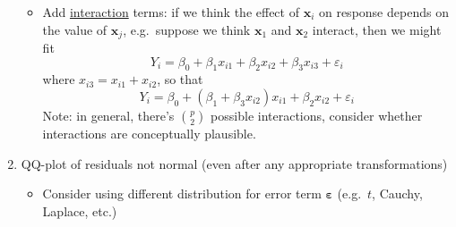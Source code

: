 \begin{enumerate}[label=(\arabic*)]
\begin{itemize}
              \item Add \underline{interaction} terms: if we think the effect
                    of $ \symbf{x}_i $ on response depends on the value of
                    $ \symbf{x}_j $, e.g.\ suppose we think $ \symbf{x}_1 $
                    and $ \symbf{x}_2 $ interact, then we might fit
                    \[ Y_i=\beta_0+\beta_1x_{i1}+\beta_2x_{i2}+\beta_3x_{i3}+\varepsilon_i \]
                    where $ x_{i3}=x_{i1}+x_{i2} $, so that
                    \[ Y_i=\beta_0+(\beta_1+\beta_3x_{i2})x_{i1}+\beta_2x_{i2}+\varepsilon_i \]
                    Note: in general, there's $ \binom{p}{2} $ possible interactions,
                    consider whether interactions are conceptually plausible.
          \end{itemize}
    \item QQ-plot of residuals not normal (even after any appropriate
          transformations)
          \begin{itemize}
              \item Consider using different distribution for error
                    term $ \symbf{\varepsilon} $ (e.g.\ $ t $,
                    Cauchy, Laplace, etc.)
          \end{itemize}
\end{enumerate}
